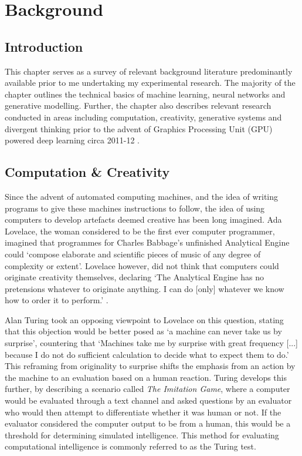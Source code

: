 \chapter{Background}
\label{ch:background}

\section{Introduction}

This chapter serves as a survey of relevant background literature predominantly available prior to me undertaking my experimental research.
The majority of the chapter outlines the technical basics of machine learning, neural networks and generative modelling.
Further, the chapter also describes relevant research conducted in areas including computation, creativity, generative systems and divergent thinking prior to the advent of Graphics Processing Unit (GPU) powered deep learning circa 2011-12 \citep{krizhevsky2012imagenet}.

\section{Computation \& Creativity}

Since the advent of automated computing machines, and the idea of writing programs to give these machines instructions to follow, the idea of using computers to develop artefacts deemed creative has been long imagined. 
Ada Lovelace, the woman considered to be the first ever computer programmer, imagined that programmes for Charles Babbage's unfinished Analytical Engine could ‘compose elaborate and scientific pieces of music of any degree of complexity or extent’.
Lovelace however, did not think that computers could originate creativity themselves, declaring ‘The Analytical Engine has no pretensions whatever to originate anything. I can do [only] whatever we know how to order it to perform.' \citep{lovelace1843notes}.

Alan Turing took an opposing viewpoint to Lovelace on this question, stating that this objection would be better posed as ‘a machine can never take us by surprise’, countering that ‘Machines take me by surprise with great frequency [...] because I do not do sufficient calculation to decide what to expect them to do.’ \citep{machinery1950computing}
This reframing from originality to surprise shifts the emphasis from an action by the machine to an evaluation based on a human reaction. 
Turing develops this further, by describing a scenario called \textit{The Imitation Game}, where a computer would be evaluated through a text channel and asked questions by an evaluator who would then attempt to differentiate whether it was human or not. 
If the evaluator considered the computer output to be from a human, this would be a threshold for determining simulated intelligence.
This method for evaluating computational intelligence is commonly referred to as the Turing test. 

